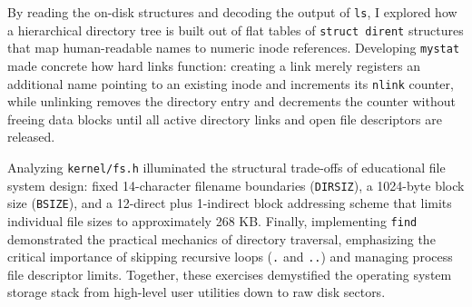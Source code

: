 \documentclass{labreport}
\begin{document}
By reading the on-disk structures and decoding the output of \texttt{ls}, I explored how a hierarchical directory tree is built out of flat tables of \texttt{struct dirent} structures that map human-readable names to numeric inode references. Developing \texttt{mystat} made concrete how hard links function: creating a link merely registers an additional name pointing to an existing inode and increments its \texttt{nlink} counter, while unlinking removes the directory entry and decrements the counter without freeing data blocks until all active directory links and open file descriptors are released.

Analyzing \texttt{kernel/fs.h} illuminated the structural trade-offs of educational file system design: fixed 14-character filename boundaries (\texttt{DIRSIZ}), a 1024-byte block size (\texttt{BSIZE}), and a 12-direct plus 1-indirect block addressing scheme that limits individual file sizes to approximately 268 KB. Finally, implementing \texttt{find} demonstrated the practical mechanics of directory traversal, emphasizing the critical importance of skipping recursive loops (\texttt{.} and \texttt{..}) and managing process file descriptor limits. Together, these exercises demystified the operating system storage stack from high-level user utilities down to raw disk sectors.
\end{document}
